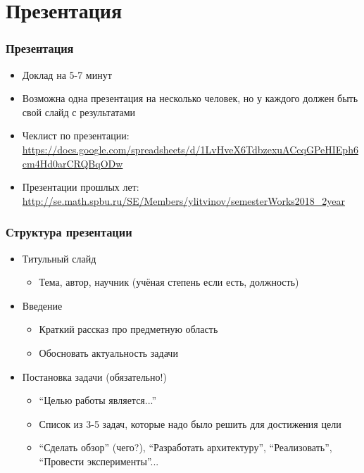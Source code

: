 \documentclass[xetex,mathserif,serif]{beamer}
\begin{document}
	\section{Презентация}

	\begin{frame}
		\frametitle{Презентация}
		\begin{itemize}
			\item Доклад на 5-7 минут
			\item Возможна одна презентация на несколько человек, но у каждого должен быть свой слайд с результатами
			\item Чеклист по презентации: \url{https://docs.google.com/spreadsheets/d/1LvHveX6TdbzexuACcqGPeHIEph6cm4Hd0arCRQBqODw}
			\item Презентации прошлых лет: \url{http://se.math.spbu.ru/SE/Members/ylitvinov/semesterWorks2018_2year}
		\end{itemize}
	\end{frame}

	\begin{frame}
		\frametitle{Структура презентации}
		\begin{itemize}
			\item Титульный слайд 
			\begin{itemize}
				\item Тема, автор, научник (учёная степень если есть, должность)
			\end{itemize}
			\item Введение
			\begin{itemize}
				\item Краткий рассказ про предметную область
				\item Обосновать актуальность задачи
			\end{itemize}
			\item Постановка задачи (обязательно!)
			\begin{itemize}
				\item ``Целью работы является...''
				\item Список из 3-5 задач, которые надо было решить для достижения цели
				\item ``Сделать обзор'' (чего?), ``Разработать архитектуру'', ``Реализовать'', ``Провести эксперименты''...
			\end{itemize}
		\end{itemize}
	\end{frame}
\end{document}
